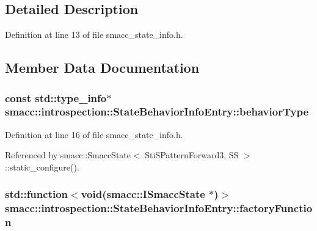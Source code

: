 \subsection{Detailed Description}


Definition at line 13 of file smacc\+\_\+state\+\_\+info.\+h.



\subsection{Member Data Documentation}
\subsubsection[{\texorpdfstring{behavior\+Type}{behaviorType}}]{\setlength{\rightskip}{0pt plus 5cm}const std\+::type\+\_\+info$\ast$ smacc\+::introspection\+::\+State\+Behavior\+Info\+Entry\+::behavior\+Type}\hypertarget{structsmacc_1_1introspection_1_1StateBehaviorInfoEntry_a7817d4924f26f4ef16dfdcf40b78b337}{}\label{structsmacc_1_1introspection_1_1StateBehaviorInfoEntry_a7817d4924f26f4ef16dfdcf40b78b337}


Definition at line 16 of file smacc\+\_\+state\+\_\+info.\+h.



Referenced by smacc\+::\+Smacc\+State$<$ Sti\+S\+Pattern\+Forward3, S\+S $>$\+::static\+\_\+configure().

\subsubsection[{\texorpdfstring{factory\+Function}{factoryFunction}}]{\setlength{\rightskip}{0pt plus 5cm}std\+::function$<$void({\bf smacc\+::\+I\+Smacc\+State} $\ast$)$>$ smacc\+::introspection\+::\+State\+Behavior\+Info\+Entry\+::factory\+Function}\hypertarget{structsmacc_1_1introspection_1_1StateBehaviorInfoEntry_ac7db4e9a687700edb0207ee100aa3576}{}\label{structsmacc_1_1introspection_1_1StateBehaviorInfoEntry_ac7db4e9a687700edb0207ee100aa3576}


